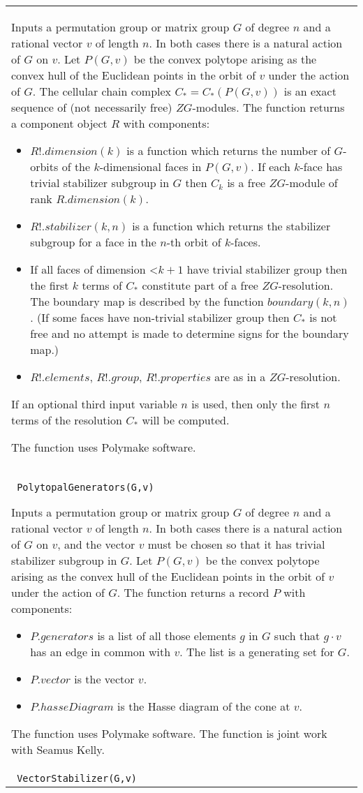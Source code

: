 \documentclass[a4paper,11pt]{report}
\begin{document}
{\begin{center}
\begin{tabular}{|l|}
 Inputs a permutation group or matrix group $G$ of degree $n$ and a rational vector $v$ of length $n$. In both cases there is a natural action of $G$ on $v$. Let $P(G,v)$ be the convex polytope arising as the convex hull of the Euclidean points in
the orbit of $v$ under the action of $G$. The cellular chain complex $C_*=C_*(P(G,v))$ is an exact sequence of (not necessarily free) $ZG$-modules. The function returns a component object $R$ with components: 
\begin{itemize}
\item  $R!.dimension(k)$ is a function which returns the number of $G$-orbits of the $k$-dimensional faces in $P(G,v)$. If each $k$-face has trivial stabilizer subgroup in $G$ then $C_k$ is a free $ZG$-module of rank $R.dimension(k)$. 
\item  $R!.stabilizer(k,n)$ is a function which returns the stabilizer subgroup for a face in the $n$-th orbit of $k$-faces. 
\item  If all faces of dimension {\textless}$k+1$ have trivial stabilizer group then the first $k$ terms of $C_*$ constitute part of a free $ZG$-resolution. The boundary map is described by the function $boundary(k,n)$ . (If some faces have non-trivial stabilizer group then $C_*$ is not free and no attempt is made to determine signs for the boundary map.) 
\item  $R!.elements$, $R!.group$, $R!.properties$ are as in a $ZG$-resolution. 
\end{itemize}
 If an optional third input variable $n$ is used, then only the first $n$ terms of the resolution $C_*$ will be computed. 

 The function uses Polymake software. \\
 \index{PolytopalGenerators} \texttt{ PolytopalGenerators(G,v) } 

 Inputs a permutation group or matrix group $G$ of degree $n$ and a rational vector $v$ of length $n$. In both cases there is a natural action of $G$ on $v$, and the vector $v$ must be chosen so that it has trivial stabilizer subgroup in $G$. Let $P(G,v)$ be the convex polytope arising as the convex hull of the Euclidean points in
the orbit of $v$ under the action of $G$. The function returns a record $P$ with components: 
\begin{itemize}
\item  $P.generators$ is a list of all those elements $g$ in $G$ such that $g\cdot v$ has an edge in common with $v$. The list is a generating set for $G$.
\item  $P.vector$ is the vector $v$.
\item $P.hasseDiagram$ is the Hasse diagram of the cone at $v$. 
\end{itemize}
 The function uses Polymake software. The function is joint work with Seamus
Kelly. \\
 \index{VectorStabilizer} \texttt{ VectorStabilizer(G,v) } 


\end{tabular}
\end{center}}
\end{document}
